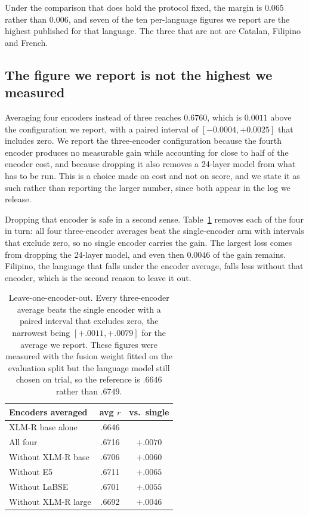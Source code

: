 Under the comparison that does hold the protocol fixed, the margin is
$0.065$ rather than $0.006$, and seven of the ten per-language figures
we report are the highest published for that language. The three that
are not are Catalan, Filipino and French.

\subsection{The figure we report is not the highest we measured}
\label{sec:notmax}

Averaging four encoders instead of three reaches $0.6760$, which is
$0.0011$ above the configuration we report, with a paired interval of
$[-0.0004, +0.0025]$ that includes zero. We report the three-encoder
configuration because the fourth encoder produces no measurable gain
while accounting for close to half of the encoder cost, and because
dropping it also removes a 24-layer model from what has to be run. This
is a choice made on cost and not on score, and we state it as such
rather than reporting the larger number, since both appear in the log
we release.

Dropping that encoder is safe in a second sense. Table~\ref{tab:loeo}
removes each of the four in turn: all four three-encoder averages beat
the single-encoder arm with intervals that exclude zero, so no single
encoder carries the gain. The largest loss comes from dropping the
24-layer model, and even then $0.0046$ of the gain remains. Filipino,
the language that falls under the encoder average, falls less without
that encoder, which is the second reason to leave it out.

\begin{table}[t]
\centering
\small
\begin{tabular}{lcc}
\toprule
Encoders averaged & avg $r$ & vs.\ single \\
\midrule
XLM-R base alone      & .6646 &  \\
All four              & .6716 & $+.0070$ \\
Without XLM-R base    & .6706 & $+.0060$ \\
Without E5            & .6711 & $+.0065$ \\
Without LaBSE         & .6701 & $+.0055$ \\
Without XLM-R large   & .6692 & $+.0046$ \\
\bottomrule
\end{tabular}
\caption{Leave-one-encoder-out. Every three-encoder average beats the
single encoder with a paired interval that excludes zero, the narrowest
being $[+.0011, +.0079]$ for the average we report. These figures were
measured with the fusion weight fitted on the evaluation split but the
language model still chosen on trial, so the reference is $.6646$ rather
than $.6749$.}
\label{tab:loeo}
\end{table}

